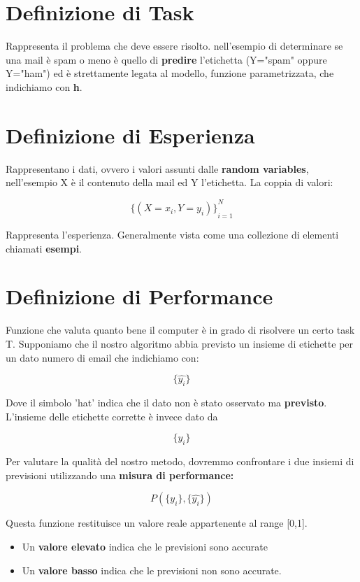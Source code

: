\section{Definizione di Task}

Rappresenta il problema che deve essere risolto. nell'esempio di determinare se una mail è spam o meno è quello di \textbf{predire} l'etichetta (Y="spam" oppure Y="ham") ed è strettamente legata al modello, funzione parametrizzata, che indichiamo con \textbf{h}.

\section{Definizione di Esperienza}

Rappresentano i dati, ovvero i valori assunti dalle \textbf{random variables}, nell'esempio X è il contenuto della mail ed Y l'etichetta. La coppia di valori:

$$
  {\{(X=x_i, Y=y_i)\}}_{i=1}^N
$$

\noindent
Rappresenta l'esperienza. Generalmente vista come una collezione di elementi chiamati \textbf{esempi}.

\section{Definizione di Performance}

Funzione che valuta quanto bene il computer è in grado di risolvere un certo task T.
Supponiamo che il nostro algoritmo abbia previsto un insieme di etichette per un dato numero di email che indichiamo con:

$$ \{\hat{y_i}\} $$

\noindent
Dove il simbolo 'hat' indica che il dato non è stato osservato ma \textbf{previsto}. L'insieme delle etichette corrette è invece dato da

$$ \{{y_i}\} $$

\noindent
Per valutare la qualità del nostro metodo, dovremmo confrontare i due insiemi di previsioni utilizzando una \textbf{misura di performance:}

$$ P(\{{y_i}\},\{\hat{y_i}\} ) $$

\noindent
Questa funzione restituisce un valore reale appartenente al range [0,1].

\begin{itemize}
\item Un \textbf{valore elevato} indica che le previsioni sono accurate
\item Un \textbf{valore basso} indica che le previsioni non sono accurate.
\end{itemize}

